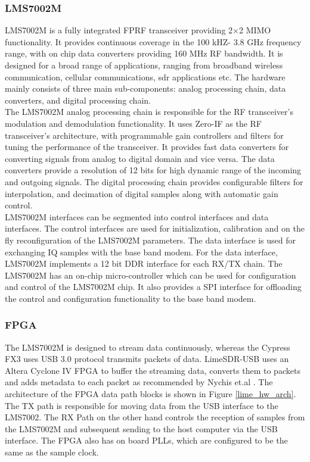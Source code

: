 \subsubsection{LMS7002M} 

LMS7002M is a fully integrated \ac{FPRF} transceiver providing 2$\times$2 \ac{MIMO} functionality.
It provides continuous coverage in the 100 kHZ- 3.8 GHz frequency range, with on chip data converters providing 160 MHz \ac{RF} bandwidth.
It is designed for a broad range of applications, ranging from broadband wireless communication, cellular communications, \ac{sdr} applications etc.
The hardware mainly consists of three main sub-components: analog processing chain, data converters, and digital processing chain.\\


The LMS7002M analog processing chain is responsible for the \ac{RF} transceiver's modulation and demodulation functionality.
It uses Zero-IF as the RF transceiver's architecture, with programmable gain controllers and filters for tuning the performance of the transceiver.
It provides fast data converters for converting signals from analog to digital domain and vice versa.
The data converters provide a resolution of 12 bits for high dynamic range of the incoming and outgoing signals.
The digital processing chain provides configurable filters for interpolation, and decimation of digital samples along with automatic gain control.\\

LMS7002M interfaces can be segmented into control interfaces and data interfaces.
The control interfaces are used for initialization, calibration and on the fly reconfiguration of the LMS7002M parameters.
The data interface is used for exchanging \ac{IQ} samples with the base band modem.
For the data interface, LMS7002M implements a 12 bit \ac{DDR} interface for each RX/TX chain.
The LMS7002M has an on-chip micro-controller which can be used for configuration and control of the LMS7002M chip.
It also provides a \ac{SPI} interface for offloading the control and configuration functionality to the base band modem.\\

\subsubsection{FPGA}

The LMS7002M is designed to stream data continuously, whereas the Cypress FX3 uses USB 3.0 protocol transmits packets of data.
LimeSDR-USB uses an Altera Cyclone IV \ac{FPGA} to buffer the streaming data, converts them to packets and adds metadata to each packet as recommended by Nychis et.al \cite{nychis_enabling_nodate}.
The architecture of the FPGA data path blocks is shown in Figure \ref{lime_hw_arch}.
The TX path is responsible for moving data from the USB interface to the LMS7002.
The RX Path on the other hand controls the reception of samples from the LMS7002M and subsequent sending to the host computer via the USB interface.
The \ac{FPGA} also has on board PLLs, which are configured to be the same as the sample clock.\\

